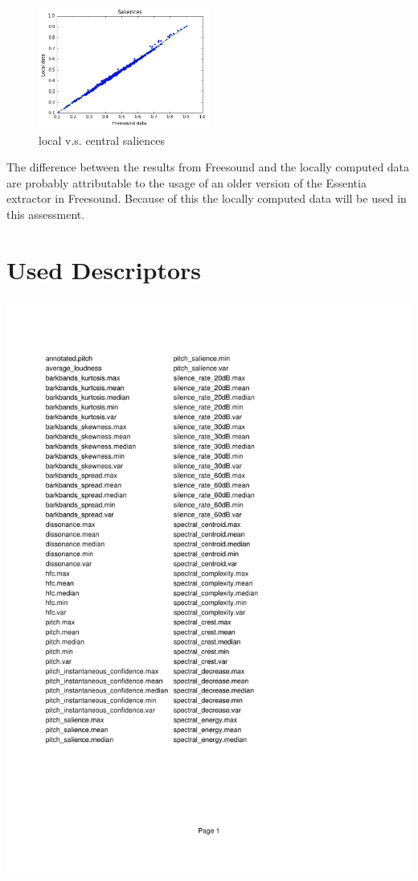 \documentclass{proc}
\begin{document}
\begin{figure}
    \centering
    \includegraphics[width=0.5\textwidth]{img/locfrs_sal.png}
    \caption{local v.s. central saliences}
    \label{fig:locfrs_sal}
\end{figure}
The difference between the results from Freesound and the locally computed data are probably attributable to the usage of an older version of the Essentia extractor in Freesound. Because of this the locally computed data will be used in this assessment.

\onecolumn
\section{Used Descriptors}
\includegraphics{img/descriptors1.pdf}
\end{document}
